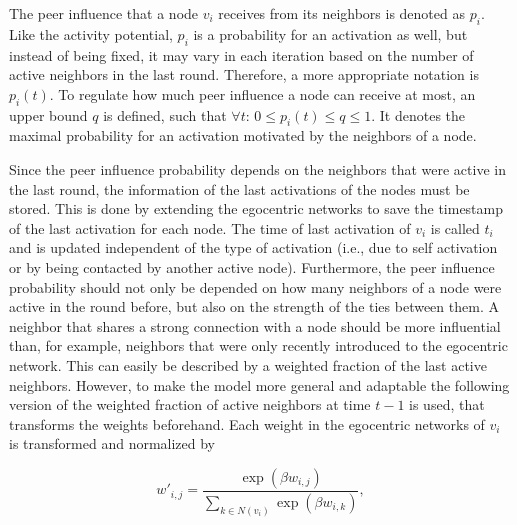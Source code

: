 The peer influence that a node \(v_{i} \) receives from its neighbors is denoted as \( p_{i} \).
Like the activity potential, \( p_{i} \) is a probability for an activation as well, but instead of being fixed, it may vary in each iteration based on the number of active neighbors in the last round.
Therefore, a more appropriate notation is \( p_{i}(t) \).
To regulate how much peer influence a node can receive at most, an upper bound \( q \) is defined, such that \( \forall t: \, 0 \leq p_{i}(t) \leq q \leq 1 \).
It denotes the maximal probability for an activation motivated by the neighbors of a node.

Since the peer influence probability depends on the neighbors that were active in the last round, the information of the last activations of the nodes must be stored.
This is done by extending the egocentric networks to save the timestamp of the last activation for each node.
The time of last activation of \( v_{i} \) is called \( t_{i} \) and is updated independent of the type of activation (i.e., due to self activation or by being contacted by another active node).
Furthermore, the peer influence probability should not only be depended on how many neighbors of a node were active in the round before, but also on the strength of the ties between them.
A neighbor that shares a strong connection with a node should be more influential than, for example, neighbors that were only recently introduced to the egocentric network.
This can easily be described by a weighted fraction of the last active neighbors.
However, to make the model more general and adaptable the following version of the weighted fraction of active neighbors at time \(t - 1\) is used, that transforms the weights beforehand.
Each weight in the egocentric networks of \( v_{i} \) is transformed and normalized by

\begin{equation}
    w'_{i,j} = \frac{\exp(\beta w_{i,j})}{\sum_{k \in N(v_{i})} \exp(\beta w_{i,k})},
\end{equation}

